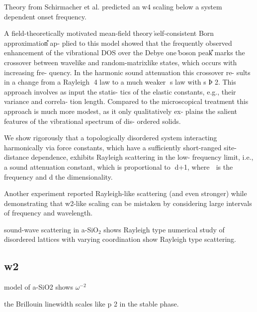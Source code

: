 \documentclass[aps,prb,twocolumn,superscriptaddress,footinbib,amsmath,amssymb,floatfix]{revtex4}
\begin{document}
Theory from Schirmacher et al. predicted 
an w4 scaling below a system dependent onset frequency.
\cite{schirmacher_thermal_2006,schirmacher_acoustic_2007}

A field-theoretically motivated
mean-field theory ͑self-consistent Born approximation͒ ap-
plied to this model
\cite{schirmacher_thermal_2006,schmid_raman_2008,
schirmacher_vibrational_2008}
showed that the frequently observed
enhancement of the vibrational DOS over the Debye one
͑boson peak͒ marks the crossover between wavelike and
random-matrixlike states, which occurs with increasing fre-
quency. In the harmonic sound attenuation this crossover re-
sults in a change from a Rayleigh ␻4 law to a much weaker
␻s law with s Ϸ 2. This approach involves as input the statis-
tics of the elastic constants, e.g., their variance and correla-
tion length. Compared to the microscopical treatment this
approach is much more modest, as it only qualitatively ex-
plains the salient features of the vibrational spectrum of dis-
ordered solids.

We show rigorously that a topologically disordered system interacting 
harmonically via force constants,
which have a sufficiently short-ranged site-distance dependence, 
exhibits Rayleigh scattering in the low-
frequency limit, i.e., a sound attenuation constant, which is 
proportional to ␻d+1, where ␻ is the frequency and
d the dimensionality.\cite{ganter_rayleigh_2010} 

Another experiment reported Rayleigh-like scattering (and even 
stronger) while demonstrating that w2-like scaling 
can be mistaken by considering large intervals of 
frequency and wavelength.\cite{ruffle_observation_2003}

sound-wave scattering in a-SiO$_2$ shows Rayleigh type 
\cite{wischnewski_sound-wave_1998}
numerical study of disordered lattices with varying coordination 
show Rayleigh type scattering.\cite{wyart_scaling_2010} 

\subsection{\label{S:Theory:Thermal}w2}

model of a-SiO2 shows $\omega^{-2}$\cite{taraskin_propagation_2000}

the Brillouin linewidth scales like p 2 in the stable phase.
\cite{ciliberti_brillouin_2003}
\end{document}
